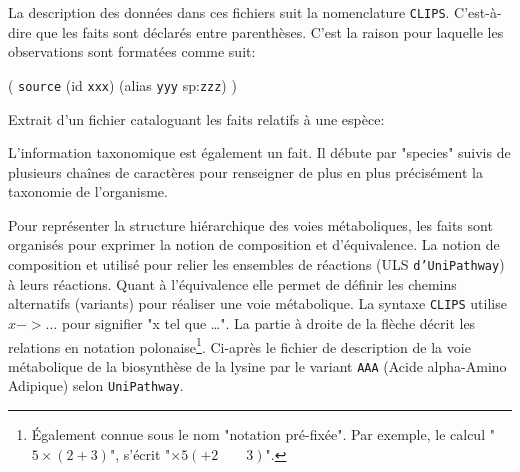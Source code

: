 \begin{refsegment}


La description des données dans ces fichiers suit la nomenclature \texttt{\gls{CLIPS}}. C'est-à-dire que les faits sont déclarés entre parenthèses. C'est la raison pour laquelle les observations sont formatées comme suit: 

( \texttt{source} (id \texttt{xxx}) (alias \texttt{yyy} sp:\texttt{zzz})  )

Extrait d'un fichier cataloguant les faits relatifs à une espèce:\nolisttopbreak



L'information taxonomique est également un fait. Il débute par "species" suivis de plusieurs chaînes de caractères pour renseigner de plus en plus précisément la taxonomie de l'organisme.


Pour représenter la structure hiérarchique des voies métaboliques, les faits sont organisés pour exprimer la notion de composition et d'équivalence. La notion de composition et utilisé pour relier les ensembles de réactions (\gls{ULS} \texttt{d’UniPathway}) à leurs réactions. Quant à l'équivalence elle permet de définir les chemins alternatifs (variants) pour réaliser une voie métabolique. La syntaxe \texttt{\gls{CLIPS}} utilise $x -> \ldots$ pour signifier "x tel que \ldots". La partie à droite de la flèche décrit les relations en notation polonaise\footnote{Également connue sous le nom "notation pré-fixée". Par exemple, le calcul "$5 \times (2 + 3)$", s'écrit "$\times 5 (+ 2 \qquad 3)$". }. Ci-après le fichier de description de la voie métabolique de la biosynthèse de la lysine par le variant \texttt{AAA} (Acide alpha-Amino Adipique) selon \texttt{UniPathway}.


\end{refsegment}
